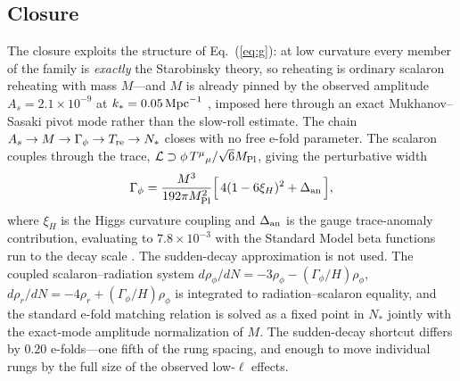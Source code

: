 \documentclass[aps,prd,twocolumn,superscriptaddress,nofootinbib,longbibliography]{revtex4-2}
\newcommand{\Mpl}{M_{\rm Pl}}
\newcommand{\Mpc}{\,{\rm Mpc}^{-1}}
\begin{document}
\subsection{Closure}
The closure exploits the structure of Eq.~(\ref{eq:g}): at low curvature every
member of the family is \emph{exactly} the Starobinsky theory, so reheating is
ordinary scalaron reheating with mass $M$---and $M$ is already pinned by the
observed amplitude $A_s=2.1\times10^{-9}$ at $k_*=0.05\Mpc$
\cite{Planck2018VI}, imposed here through an exact Mukhanov--Sasaki pivot
mode rather than the slow-roll estimate. The chain
$A_s\to M\to\Gamma_\phi\to T_{\rm re}\to N_*$ closes with no free e-fold
parameter. The scalaron couples through the trace,
${\cal L}\supset\phi\,T^\mu{}_\mu/\sqrt{6}\Mpl$, giving the perturbative width
\begin{equation}
\Gamma_\phi=\frac{M^3}{192\pi\Mpl^2}
\Big[\,4(1-6\xi_H)^2+\Delta_{\rm an}\,\Big],
\end{equation}
where $\xi_H$ is the Higgs curvature coupling and $\Delta_{\rm an}$ is the
gauge trace-anomaly contribution, evaluating to $7.8\times10^{-3}$ with the
Standard Model beta functions run to the decay scale
\cite{GorbunovPanin2010,GorbunovTokareva2012}.
The sudden-decay approximation is not used. The coupled
scalaron--radiation system
$d\rho_\phi/dN=-3\rho_\phi-(\Gamma_\phi/H)\rho_\phi$,
$d\rho_r/dN=-4\rho_r+(\Gamma_\phi/H)\rho_\phi$ is integrated to
radiation--scalaron equality, and the standard e-fold matching relation
\cite{LiddleLeach2003,Planck2018X} is solved as a fixed
point in $N_*$ jointly with the exact-mode amplitude normalization of $M$.
The sudden-decay shortcut differs by $0.20$ e-folds---one fifth of the rung
spacing, and enough to move individual rungs by the full size of the observed
low-$\ell$ effects.
\end{document}
